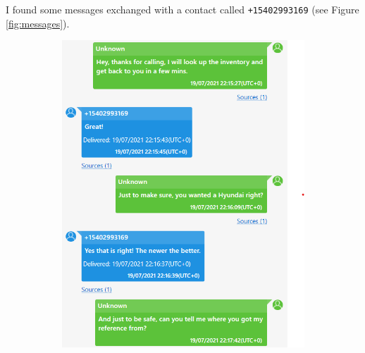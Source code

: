 \documentclass[12pt]{article}
\begin{document}
I found some messages exchanged with a contact called \texttt{+15402993169} (see Figure \ref{fig:messages}).

\begin{figure}[!ht]
    \centering
    \begin{subfigure}[b]{0.3\textwidth}
        \centering
        \includegraphics[width=\textwidth]{images/ss1.png}
        \caption{}
    \end{subfigure}
    \hspace{2 pt}
    \begin{subfigure}[b]{0.3\textwidth}
        \centering

\end{subfigure}
\end{figure}
\end{document}
